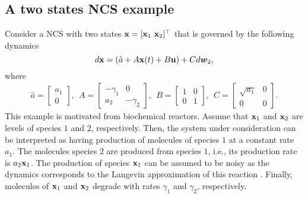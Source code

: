 \documentclass[letterpaper, 10 pt,one column, conference]{ieeeconf}  %
\begin{document}
\subsection{A two states NCS example}
Consider a NCS with two states $\bold x = [\bold x_1 \ \bold x_2]^\top$ that is governed by the following dynamics
\begin{equation}
d \bold x = \left(\hat{a}+A \bold x(t)+ B \bold u \right) + C d\boldsymbol{w}_2, 
\end{equation}
where 
\begin{equation}
\begin{aligned}
 \hat{a}=\left[\begin{array}{c}
a_1\\ 0
\end{array}\right] , \ \  A=  \left[\begin{array}{cc}
 -\gamma_1   & 0 \\ a_2 & -\gamma_2 
\end{array}\right] , \ \  B=\left[\begin{array}{cc}
1  & 0 \\ 0 & 1
\end{array}\right] , \ \   C=  \left[\begin{array}{cc}
\sqrt{a_1}  & 0 \\ 0 & 0
\end{array}\right]  .
\end{aligned}
\end{equation}
This example is motivated from biochemical reactors. Assume that $\bold x_1$ and $\bold x_2$ are levels of species $1$ and $2$, respectively. Then, the system under consideration can be interpreted as having production of  molecules of species $1$ at a constant rate $a_1$. The molecules species $2$ are produced from species $1$, i.e., its production rate is $a_2\bold x_1$. The production of species $\bold x_1 $ can be assumed to be noisy as the dynamics corresponds to the Langevin approximation of this reaction \cite{gil00}. Finally, molecules of $\bold x_1$ and $\bold x_2$ degrade with rates $\gamma_1$ and $\gamma_2$, respectively. 
\end{document}
